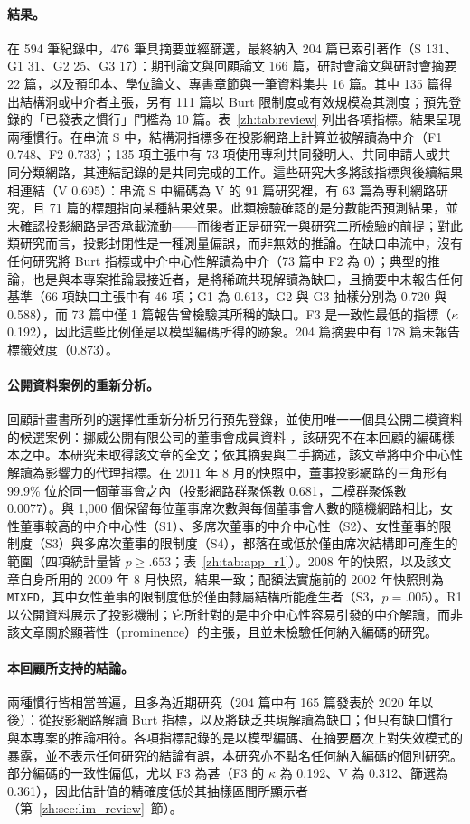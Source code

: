 \paragraph{結果。} 在 594 筆紀錄中，476 筆具摘要並經篩選，最終納入 204 篇已索引著作（S 131、G1 31、G2 25、G3 17）：期刊論文與回顧論文 166 篇，研討會論文與研討會摘要 22 篇，以及預印本、學位論文、專書章節與一筆資料集共 16 篇。其中 135 篇得出結構洞或中介者主張，另有 111 篇以 Burt 限制度或有效規模為其測度；預先登錄的「已發表之慣行」門檻為 10 篇。表~\ref{zh:tab:review} 列出各項指標。結果呈現兩種慣行。在串流 S 中，結構洞指標多在投影網路上計算並被解讀為中介（F1 0.748、F2 0.733）；135 項主張中有 73 項使用專利共同發明人、共同申請人或共同分類網路，其連結記錄的是共同完成的工作。這些研究大多將該指標與後續結果相連結（V 0.695）：串流 S 中編碼為 V 的 91 篇研究裡，有 63 篇為專利網路研究，且 71 篇的標題指向某種結果效果。此類檢驗確認的是分數能否預測結果，並未確認投影網路是否承載流動——而後者正是研究一與研究二所檢驗的前提；對此類研究而言，投影封閉性是一種測量偏誤，而非無效的推論。在缺口串流中，沒有任何研究將 Burt 指標或中介中心性解讀為中介（73 篇中 F2 為 0）；典型的推論，也是與本專案推論最接近者，是將稀疏共現解讀為缺口，且摘要中未報告任何基準（66 項缺口主張中有 46 項；G1 為 0.613，G2 與 G3 抽樣分別為 0.720 與 0.588），而 73 篇中僅 1 篇報告曾檢驗其所稱的缺口。F3 是一致性最低的指標（$\kappa$ 0.192），因此這些比例僅是以模型編碼所得的跡象。204 篇摘要中有 178 篇未報告標籤效度（0.873）。

\paragraph{公開資料案例的重新分析。} 回顧計畫書所列的選擇性重新分析另行預先登錄，並使用唯一一個具公開二模資料的候選案例：挪威公開有限公司的董事會成員資料 \citep{seierstad2011few}，該研究不在本回顧的編碼樣本之中。本研究未取得該文章的全文；依其摘要與二手摘述，該文章將中介中心性解讀為影響力的代理指標。在 2011 年 8 月的快照中，董事投影網路的三角形有 99.9\% 位於同一個董事會之內（投影網路群聚係數 0.681，二模群聚係數 0.0077）。與 1,000 個保留每位董事席次數與每個董事會人數的隨機網路相比，女性董事較高的中介中心性（S1）、多席次董事的中介中心性（S2）、女性董事的限制度（S3）與多席次董事的限制度（S4），都落在或低於僅由席次結構即可產生的範圍（四項統計量皆 $p \geq .653$；表~\ref{zh:tab:app_r1}）。2008 年的快照，以及該文章自身所用的 2009 年 8 月快照，結果一致；配額法實施前的 2002 年快照則為 \texttt{MIXED}，其中女性董事的限制度低於僅由隸屬結構所能產生者（S3，$p = .005$）。R1 以公開資料展示了投影機制；它所針對的是中介中心性容易引發的中介解讀，而非該文章關於顯著性（prominence）的主張，且並未檢驗任何納入編碼的研究。

\paragraph{本回顧所支持的結論。} 兩種慣行皆相當普遍，且多為近期研究（204 篇中有 165 篇發表於 2020 年以後）：從投影網路解讀 Burt 指標，以及將缺乏共現解讀為缺口；但只有缺口慣行與本專案的推論相符。各項指標記錄的是以模型編碼、在摘要層次上對失效模式的暴露，並不表示任何研究的結論有誤，本研究亦不點名任何納入編碼的個別研究。部分編碼的一致性偏低，尤以 F3 為甚（F3 的 $\kappa$ 為 0.192、V 為 0.312、篩選為 0.361），因此估計值的精確度低於其抽樣區間所顯示者（第~\ref{zh:sec:lim_review}~節）。
